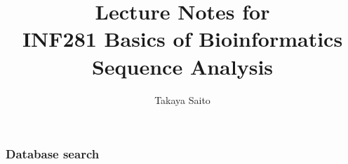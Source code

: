 \documentclass[12pt]{article}
\title{Lecture Notes for \\ INF281 Basics of Bioinformatics Sequence Analysis}
\author{Takaya Saito}
\date{}
\begin{document}
\setcounter{page}{36}

\makeatletter 
\renewcommand{\thefigure}{\arabic{section}.\arabic{figure}}
\renewcommand{\thetable}{\arabic{section}.\arabic{table}}
\makeatother

%
%
\setcounter{part}{2}
\part{}

%
%
\setcounter{section}{4}
\setcounter{figure}{0}
\setcounter{table}{0}
\section{Database search}






\end{document}
